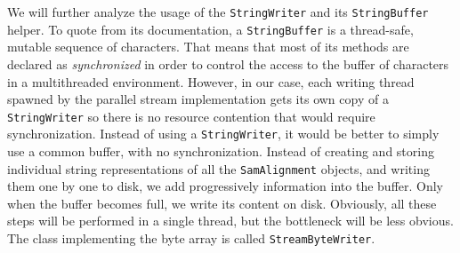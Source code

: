 \documentclass[a4paper,twoside]{article}
\begin{document}
We will further analyze the usage of the \texttt{StringWriter} and its \texttt{StringBuffer} helper.
To quote from its documentation, a {\texttt{StringBuffer}} is  a thread-safe, mutable sequence of characters.
That means that most of its methods are declared as {\textit{synchronized}} in order to control the access to the buffer of characters in a multithreaded environment.
However, in our case, each writing thread spawned by the parallel stream implementation gets its own copy of a {\texttt{StringWriter}} so there is no resource contention that would require synchronization.
Instead of using a {\texttt{StringWriter}}, it would be better to simply use a common buffer, with no synchronization.
Instead of creating and storing individual string representations of all the {\texttt{SamAlignment}} objects, and writing them one by one to disk, we add progressively information into the buffer.
Only when the buffer becomes full, we write its content on disk.
Obviously, all these steps will be performed in a single thread, but the bottleneck will be less obvious.
The class implementing the byte array is called {\texttt{StreamByteWriter}}.
\end{document}

